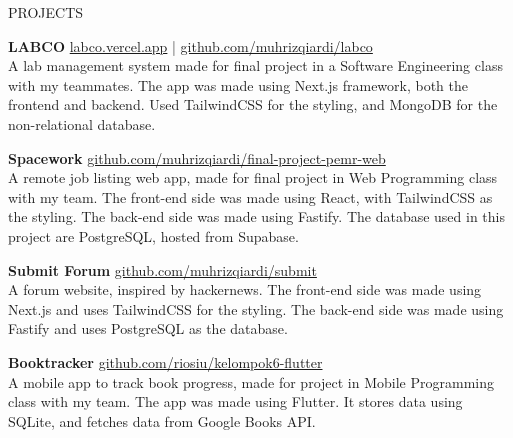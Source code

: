 \documentclass{resume}
\begin{document}
\begin{rSection}{PROJECTS}
\vspace{-1.25em}
\item \textbf{LABCO} {\hfill \href{https://labco.vercel.app/}{labco.vercel.app} | \href{https://github.com/muhrizqiardi/labco}{github.com/muhrizqiardi/labco}\\
A lab management system made for final project in a Software Engineering class with my teammates. The app was made using Next.js framework, both the frontend and backend. Used TailwindCSS for the styling, and MongoDB for the non-relational database.}
\item \textbf{Spacework} {\hfill\href{https://github.com/muhrizqiardi/final-project-pemr-web}{github.com/muhrizqiardi/final-project-pemr-web}\\
A remote job listing web app, made for final project in Web Programming class with my team. The front-end side was made using React, with TailwindCSS as the styling. The back-end side was made using Fastify. The database used in this project are PostgreSQL, hosted from Supabase.}
\item \textbf{Submit Forum} {\hfill\href{https://github.com/muhrizqiardi/submit}{github.com/muhrizqiardi/submit}\\
A forum website, inspired by hackernews. The front-end side was made using Next.js and uses TailwindCSS for the styling. The back-end side was made using Fastify and uses PostgreSQL as the database.}
\item \textbf{Booktracker} {\hfill\href{https://github.com/riosiu/kelompok6-flutter}{github.com/riosiu/kelompok6-flutter}\\
A mobile app to track book progress, made for project in Mobile Programming class with my team. The app was made using Flutter. It stores data using SQLite, and fetches data from Google Books API.}
\end{rSection} 
\end{document}
